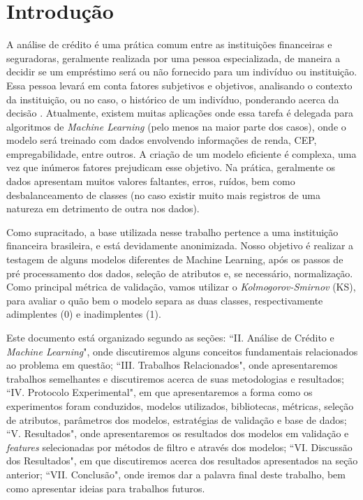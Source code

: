 \section{Introdução}
A análise de crédito é uma prática comum entre as instituições financeiras e seguradoras, geralmente realizada por uma pessoa especializada, de maneira a decidir se um empréstimo será ou não fornecido para um indivíduo ou instituição. Essa pessoa levará em conta fatores subjetivos e objetivos, analisando o contexto da instituição, ou no caso, o histórico de um indivíduo, ponderando acerca da decisão \cite{b1}. Atualmente, existem muitas aplicações onde essa tarefa é delegada para algoritmos de \textit{Machine Learning} (pelo menos na maior parte dos casos), onde o modelo será treinado com dados envolvendo informações de renda, CEP, empregabilidade, entre outros. A criação de um modelo eficiente é complexa, uma vez que inúmeros fatores prejudicam esse objetivo. Na prática, geralmente os dados apresentam muitos valores faltantes, erros, ruídos, bem como desbalanceamento de classes (no caso existir muito mais registros de uma natureza em detrimento de outra nos dados). 

Como supracitado, a base utilizada nesse trabalho pertence a uma instituição financeira brasileira, e está devidamente anonimizada. Nosso objetivo é realizar a testagem de alguns modelos diferentes de Machine Learning, após os passos de pré processamento dos dados, seleção de atributos e, se necessário, normalização. Como principal métrica de validação, vamos utilizar o \textit{Kolmogorov-Smirnov} (KS), para avaliar o quão bem o modelo separa as duas classes, respectivamente adimplentes (0) e inadimplentes (1).

Este documento está organizado segundo as seções: ``II. Análise de Crédito e \textit{Machine Learning}", onde discutiremos alguns conceitos fundamentais relacionados ao problema em questão; ``III. Trabalhos Relacionados", onde apresentaremos trabalhos semelhantes e discutiremos acerca de suas metodologias e resultados; ``IV. Protocolo Experimental", em que apresentaremos a forma como os experimentos foram conduzidos, modelos utilizados, bibliotecas, métricas, seleção de atributos, parâmetros dos modelos, estratégias de validação e base de dados; ``V. Resultados", onde apresentaremos os resultados dos modelos em validação e \textit{features} selecionadas por métodos de filtro e através dos modelos; ``VI. Discussão dos Resultados", em que discutiremos acerca dos resultados apresentados na seção anterior; ``VII. Conclusão", onde iremos dar a palavra final deste trabalho, bem como apresentar ideias para trabalhos futuros.